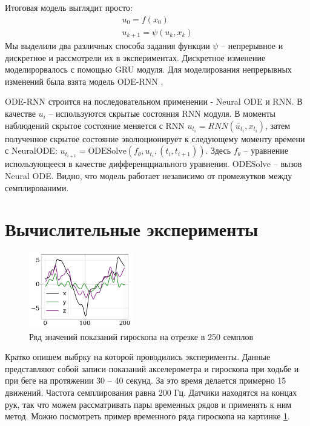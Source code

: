 \documentclass[12pt, twoside]{article}
\begin{document}
Итоговая модель выглядит просто:
\begin{equation}
	\begin{split}
		u_0 = f(x_0) \\ 
		u_{k + 1} = \psi(u_k, x_k)
	\end{split}
\end{equation}
Мы выделили два различных способа задания функции $\psi$ -- непрерывное и дискретное и рассмотрели их в экспериментах. Дискретное изменение моделирорвалось с помощью GRU модуля. Для моделирования непрерывных изменений была взята модель ODE-RNN \cite{Rubanova2019}, 

ODE-RNN строится на последовательном применении - Neural ODE \cite{Chen2018} и RNN.
В качестве $u_i$ -- используются скрытые состояния RNN модуля. В моменты наблюдений скрытое состояние меняется с RNN $u_{t_i} = RNN(\widetilde{u_{t_i}}, x_{t_i})$, затем полученное скрытое состояние эволюционирует к следующему моменту времени с NeuralODE: $u_{t_{i+1}} = \text{ODESolve}(f_\theta, u_{t_i}, (t_i, t_{i+1}))$. Здесь $f_\theta$ -- уравнение использующееся в качестве дифференцциального уравнения. $\text{ODESolve}$ -- вызов Neural ODE. Видно, что модель работает независимо от промежутков между семплированими. 

\section{Вычислительные эксперименты}
\label{experiments}


\begin{figure}
	\includegraphics[width=0.4\textwidth]{images/ряд.jpg} 
	\caption{Ряд значений показаний гироскопа на отрезке в 250 семплов}
	\label{ряд}
\end{figure}

	Кратко опишем выбрку на которой проводились эксперименты. Данные представляют собой записи показаний акселерометра и гироскопа при ходьбе и при беге на протяжении 30 -- 40 секунд. За это время делается примерно 15 движений. Частота семплирования равна 200 Гц. Датчики находятся на концах рук, так что можем рассматривать пары временных рядов и применять к ним метод. Можно посмотреть пример временного ряда гироскопа на картинке \ref{ряд}.
\end{document}
